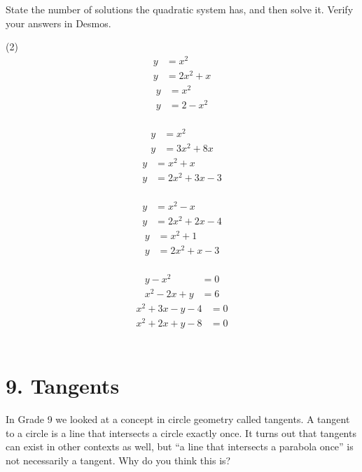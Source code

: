\documentclass[12pt,fleqn]{book}
\newcommand{\prb}[1]{\begin{Exercise}#1\end{Exercise}}
\begin{document}
\prb{State the number of solutions the quadratic system has, and then solve it.  Verify your answers in Desmos.
	\begin{tasks}(2)
		\task
		\begin{align*}
			y & =x^2     \\
			y & =2 x^2+x
		\end{align*}
		\task
		\begin{align*}
			y & =x^2   \\
			y & =2-x^2
		\end{align*}\\[8em]
		\task
		\begin{align*}
			y & =x^2       \\
			y & =3 x^2+8 x
		\end{align*}
		\task
		\begin{align*}
			y & =x^2+x       \\
			y & =2 x^2+3 x-3
		\end{align*}\\[8em]
		\task
		\begin{align*}
			y & =x^2-x       \\
			y & =2 x^2+2 x-4
		\end{align*}
		\task
		\begin{align*}
			y & =x^2+1     \\
			y & =2 x^2+x-3
		\end{align*}\\[8em]
		\task
		\begin{align*}
			y-x^2     & =0 \\
			x^2-2 x+y & =6
		\end{align*}
		\task
		\begin{align*}
			x^2+3 x-y-4 & =0 \\
			x^2+2 x+y-8 & =0
		\end{align*}\\[8em]
	\end{tasks}
}







\chapter{9. Tangents}
In Grade 9 we looked at a concept in circle geometry called tangents.  A tangent to a circle is a line that intersects a circle exactly once.  It turns out that tangents can exist in other contexts as well, but ``a line that intersects a parabola once'' is not necessarily a tangent.  Why do you think this is?
\\[1em]
\end{document}
